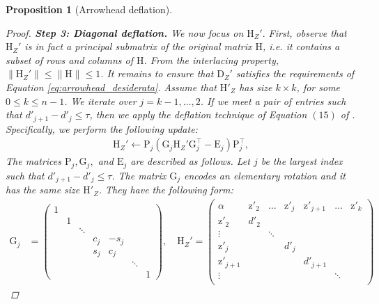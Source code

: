 \documentclass{article}
\newtheorem{proposition}{Proposition}[section]
\newcommand\vecz{\boldsymbol{\mathrm{z}}}
\newcommand\matD{\boldsymbol{\mathrm{D}}}
\newcommand\matE{\boldsymbol{\mathrm{E}}}
\newcommand\matG{\boldsymbol{\mathrm{G}}}
\newcommand\matH{\boldsymbol{\mathrm{H}}}
\newcommand\matP{\boldsymbol{\mathrm{P}}}
\begin{document}
\begin{proposition}[Arrowhead deflation]
\begin{proof}
        \textbf{Step 3: Diagonal deflation.}
        We now focus on $\matH_Z'.$ First, observe that $\matH_Z'$ is in fact a principal submatrix of the original matrix $\matH$, i.e. it contains a subset of rows and columns of $\matH$. From the interlacing property, $\|\matH_Z'\|\leq \|\matH\|\leq 1$.
        It remains to ensure that $\matD_Z'$ satisfies the requirements of Equation \eqref{eq:arrowhead_desiderata}.
        Assume that $\matH'_Z$ has size $k\times k$, for some $0\leq k\leq n-1$. 
        We iterate over $j=k-1,\ldots,2$. If we meet a pair of entries such that $d'_{j+1}-d'_j \leq \tau$, then we apply the deflation technique of Equation $(15)$ of \cite{gu1995divide}. Specifically, we perform the following update:
            \begin{align*}
                \matH_Z' \leftarrow \matP_j (\matG_j \matH_Z' \matG_j^\top - \matE_j)\matP_j^\top,
            \end{align*}
        The matrices $\matP_j,\matG_j,$ and $\matE_j$ are described as follows. Let $j$ be the largest index such that $d'_{j+1}-d'_j\leq \tau$. The matrix $\matG_j$ encodes an elementary rotation and it has the same size $\matH'_Z$. They have the following form:
        \begin{align*}
        \matG_j &= \begin{pmatrix}
                1 &  &  &  &  &  & \\
                 & 1 &  &  &  & &\\
                 &  & \ddots &  &  & &\\
                 &  &  & c_j & -s_j & &\\
                 &  &  & s_j & c_j & & \\
                 &  &  &  && \ddots &\\
                 &  &  &  && &1
            \end{pmatrix},
            \quad
            \matH_Z' = \begin{pmatrix}
                \alpha & \vecz'_2 & \ldots & \vecz'_j & \vecz'_{j+1} & \ldots & \vecz'_k\\
                \vecz'_2 & d'_2 &  &  &  & &\\
                \vdots &  & \ddots &  &  & &\\
                \vecz'_j &  &  & d'_j &  & &\\
                \vecz'_{j+1} &  &  &  &d'_{j+1} & & \\
                \vdots &  &  &  && \ddots  &\\

\end{pmatrix}
\end{align*}
\end{proof}
\end{proposition}
\end{document}
